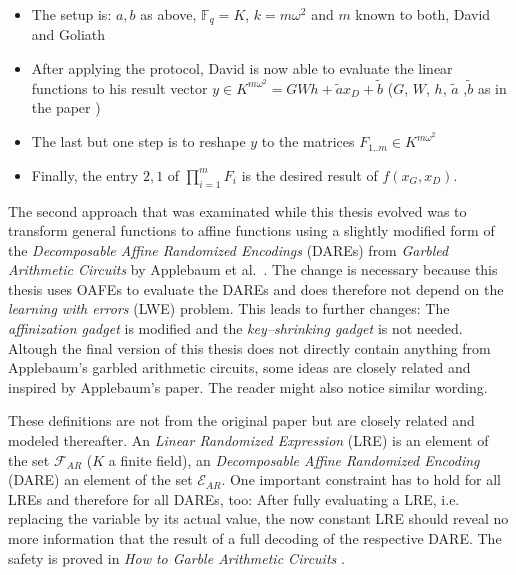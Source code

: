 \begin{itemize}

\item The setup is: $a, b$ as above, $\mathbb{F}_q = K$, $k = m\omega^2$ and $m$
known to both, David and Goliath

\item After applying the protocol, David is now able to evaluate the linear
functions to his result vector $y \in K^{m\omega^2} = GWh + \tilde{a}x_D +
\tilde{b}$ ($G$, $W$, $h$, $\tilde{a}$ ,$\tilde{b}$ as in the paper
\cite{davidgoliath})

\item The last but one step is to reshape $y$ to the matrices $F_{1..m}
\in K^{m\omega^2}$

\item Finally, the entry $2, 1$ of $\prod_{i=1}^m F_i$ is the desired result of
$f(x_G,x_D)$.

\end{itemize}


%
%
\label{sec:dare}

The second approach that was examinated while this thesis evolved was to
transform general functions to affine functions using a slightly modified form
of the \emph{Decomposable Affine Randomized Encodings} (DAREs) from
\emph{Garbled Arithmetic Circuits} by Applebaum et al.\ \cite{gac2012}. The
change is necessary because this thesis uses OAFEs to evaluate the DAREs
and does therefore not depend on the \emph{learning with errors} (LWE) problem.
This leads to further changes: The \emph{affinization gadget} \cite{gac2012} is
modified and the \emph{key--shrinking gadget} \cite{gac2012} is not needed.
Altough the final version of this thesis does not directly contain anything from
Applebaum's garbled arithmetic circuits, some ideas are closely related and
inspired by Applebaum's paper. The reader might also notice similar wording.


\label{sec:affinization_definitions}

These definitions are not from the original paper but are closely related and
modeled thereafter. An \emph{Linear Randomized Expression} (LRE) is an element
of the set $\mathcal{F}_{AR}$ ($K$ a finite field), an \emph{Decomposable Affine
Randomized Encoding} (DARE) an element of the set $\mathcal{E}_{AR}$. One
important constraint has to hold for all LREs and therefore for all DAREs, too:
After fully evaluating a LRE, i.e. replacing the variable by its actual value,
the now constant LRE should reveal no more information that the result of a full
decoding of the respective DARE. The safety is proved in \emph{How to Garble
Arithmetic Circuits} \cite{gac2012}.

